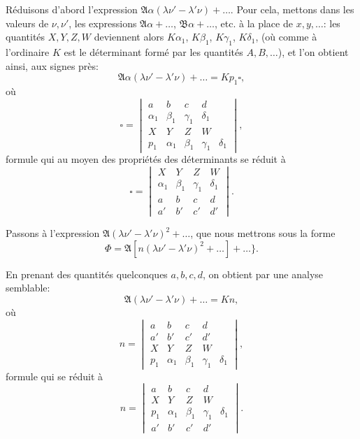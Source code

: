 \documentclass[11pt,a4paper]{book}
\begin{document}
R\'{e}duisons d'abord l'expression $\mathfrak{A}\alpha(\lambda \nu' - \lambda' \nu) + \ldots$. Pour cela, mettons dans les valeurs de $\nu, \nu'$, les expressions $\mathfrak{A}\alpha + \ldots$, $\mathfrak{B}\alpha + \ldots$, etc. \`{a} la place de $x, y, \ldots$: les quantit\'{e}s $X, Y, Z, W$ deviennent alors $K\alpha_1$, $K\beta_1$, $K\gamma_1$, $K\delta_1$, (o\`{u} comme \`{a} l'ordinaire $K$ est le d\'{e}terminant form\'{e} par les quantit\'{e}s $A, B, \ldots$), et l'on obtient ainsi, aux signes pr\`{e}s:
\[
\mathfrak{A}\alpha(\lambda \nu' - \lambda' \nu) + \ldots = Kp_1 \square,
\]
o\`{u}
\[
\square =
\begin{vmatrix}
a & b & c & d \\
\alpha_1 & \beta_1 & \gamma_1 & \delta_1 \\
X & Y & Z & W \\
p_1 & \alpha_1 & \beta_1 & \gamma_1 & \delta_1
\end{vmatrix},
\]
formule qui au moyen des propri\'{e}t\'{e}s des d\'{e}terminants se r\'{e}duit \`{a}
\[
\square =
\begin{vmatrix}
X & Y & Z & W \\
\alpha_1 & \beta_1 & \gamma_1 & \delta_1 \\
a & b & c & d \\
a' & b' & c' & d'
\end{vmatrix}.
\]

Passons \`{a} l'expression $\mathfrak{A}(\lambda \nu' - \lambda' \nu)^2 + \ldots$, que nous mettrons sous la forme
\[
\Phi = \mathfrak{A}[n(\lambda \nu' - \lambda' \nu)^2 + \ldots] + \ldots\}.
\]

En prenant des quantit\'{e}s quelconques $a, b, c, d$, on obtient par une analyse semblable:
\[
\mathfrak{A}(\lambda \nu' - \lambda' \nu) + \ldots = Kn,
\]
o\`{u}
\[
n =
\begin{vmatrix}
a & b & c & d \\
a' & b' & c' & d' \\
X & Y & Z & W \\
p_1 & \alpha_1 & \beta_1 & \gamma_1 & \delta_1
\end{vmatrix},
\]
formule qui se r\'{e}duit \`{a}
\[
n =
\begin{vmatrix}
a & b & c & d \\
X & Y & Z & W \\
p_1 & \alpha_1 & \beta_1 & \gamma_1 & \delta_1 \\
a' & b' & c' & d'
\end{vmatrix}.
\]
\end{document}
